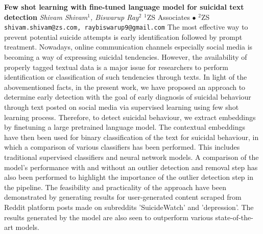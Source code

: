 
    \begin{conf-abstract}[]
        {\textbf{Few shot learning with fine-tuned language model for suicidal text detection}}
        {\textit{Shivam Shivam$^{1}$, Biswarup Ray$^{2}$}}
        {$^{1}$ZS Associates $\bullet$ $^{2}$ZS}
        {\texttt{shivam.shivam@zs.com, raybiswarup9@gmail.com}}
        {The most effective way to prevent potential suicide attempts is early identification followed by prompt treatment. Nowadays, online communication channels especially social media is becoming a way of expressing suicidal tendencies. However, the availability of properly tagged textual data is a major issue for researchers to perform identification or classification of such tendencies through texts. In light of the abovementioned facts, in the present work, we have proposed an approach to determine early detection with the goal of early diagnosis of suicidal behaviour through text posted on social media via supervised learning using few shot learning process. Therefore, to detect suicidal behaviour, we extract embeddings by finetuning a large pretrained language model. The contextual embeddings have then been used for binary classification of the text for suicidal behaviour, in which a comparison of various classifiers has been performed. This includes traditional supervised classifiers and neural network models. A comparison of the model's performance with and without an outlier detection and removal step has also been performed to highlight the importance of the outlier detection step in the pipeline. The feasibility and practicality of the approach have been demonstrated by generating results for user-generated content scraped from Reddit platform posts made on subreddits 'SuicideWatch' and 'depression'. The results generated by the model are also seen to outperform various state-of-the-art models.}
    \end{conf-abstract}
        